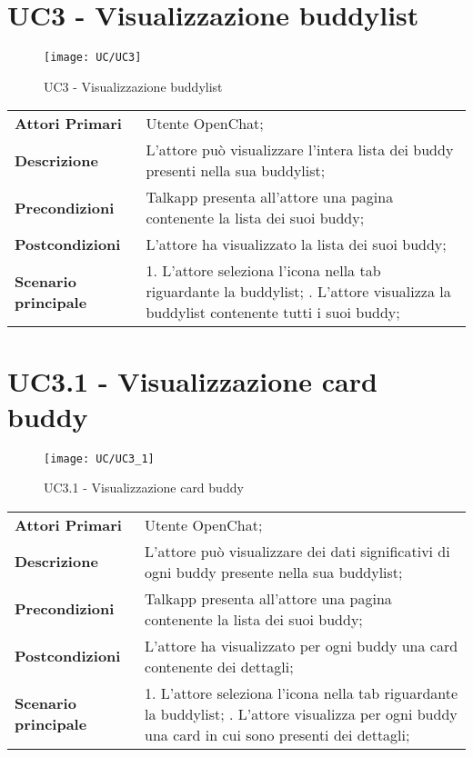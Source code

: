 \section{UC3 - Visualizzazione buddylist}
	\begin{figure}[H] 
	\centering
	\texttt{[image: UC/UC3]}
	\caption{UC3 - Visualizzazione buddylist}
\end{figure}
	\begin{center}
	\bgroup
	\def\arraystretch{1.8}     
	\begin{longtable}{  p{4cm} | p{9.5cm} } 
		\textbf{Attori Primari} & Utente OpenChat; \\ 
		\textbf{Descrizione} &  L'attore può visualizzare l'intera lista dei buddy presenti nella sua buddylist; \\ 
		\textbf{Precondizioni}  & Talkapp presenta all'attore una pagina contenente la lista dei suoi buddy; \\
		\textbf{Postcondizioni} & L'attore ha visualizzato la lista dei suoi buddy;  \\ 
		\textbf{Scenario principale} & 
		1. L'attore seleziona l'icona nella tab riguardante la buddylist; \newline
		2. L'attore visualizza la buddylist contenente tutti i suoi buddy;
	\end{longtable}
	\egroup
\end{center}

\section{UC3.1 - Visualizzazione card buddy}
	\begin{figure}[H] 
	\centering
	\texttt{[image: UC/UC3\_1]}
	\caption{UC3.1 - Visualizzazione card buddy}
\end{figure}
		\begin{center}
		\bgroup
		\def\arraystretch{1.8}     
		\begin{longtable}{  p{4cm} | p{9.5cm} } 
			\textbf{Attori Primari} & Utente OpenChat; \\ 
			\textbf{Descrizione} &  L'attore può visualizzare dei dati significativi di ogni buddy presente nella sua buddylist; \\ 
			\textbf{Precondizioni}  & Talkapp presenta all'attore una pagina contenente la lista dei suoi buddy; \\
			\textbf{Postcondizioni} & L'attore ha visualizzato per ogni buddy una card contenente dei dettagli;  \\ 
			\textbf{Scenario principale} & 
			1. L'attore seleziona l'icona nella tab riguardante la buddylist; \newline
			2. L'attore visualizza per ogni buddy una card in cui sono presenti dei dettagli;
		\end{longtable}
		\egroup
	\end{center}

